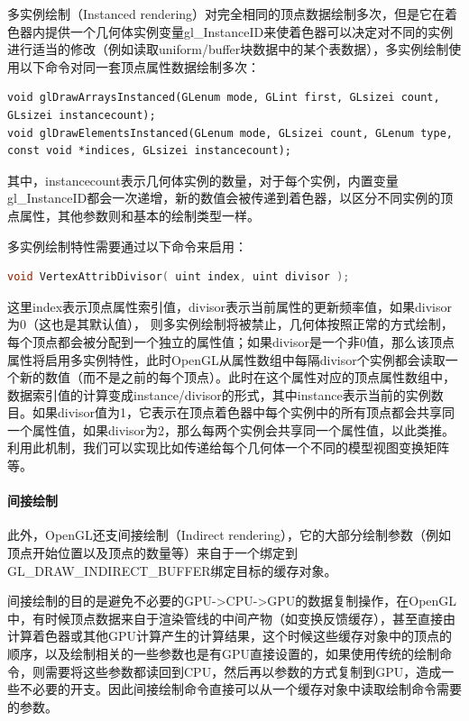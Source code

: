多实例绘制（Instanced rendering）对完全相同的顶点数据绘制多次，但是它在着色器内提供一个几何体实例变量gl\_InstanceID来使着色器可以决定对不同的实例进行适当的修改（例如读取uniform/buffer块数据中的某个表数据），多实例绘制使用以下命令对同一套顶点属性数据绘制多次：

\begin{lstlisting}
void glDrawArraysInstanced​(GLenum mode​, GLint first​, GLsizei count​, GLsizei instancecount​);
void glDrawElementsInstanced​(GLenum mode​, GLsizei count​, GLenum type​, const void *indices​, GLsizei instancecount​);
\end{lstlisting}

其中，instancecount表示几何体实例的数量，对于每个实例，内置变量gl\_InstanceID都会一次递增，新的数值会被传递到着色器，以区分不同实例的顶点属性，其他参数则和基本的绘制类型一样。

多实例绘制特性需要通过以下命令来启用：

\begin{lstlisting}[language=C++]
void VertexAttribDivisor( uint index, uint divisor );
\end{lstlisting}

这里index表示顶点属性索引值，divisor表示当前属性的更新频率值，如果divisor为0（这也是其默认值）， 则多实例绘制将被禁止，几何体按照正常的方式绘制，每个顶点都会被分配到一个独立的属性值；如果divisor是一个非0值，那么该顶点属性将启用多实例特性，此时OpenGL从属性数组中每隔divisor个实例都会读取一个新的数值（而不是之前的每个顶点）。此时在这个属性对应的顶点属性数组中，数据索引值的计算变成instance/divisor的形式，其中instance表示当前的实例数目。如果divisor值为1，它表示在顶点着色器中每个实例中的所有顶点都会共享同一个属性值，如果divisor为2，那么每两个实例会共享同一个属性值，以此类推。利用此机制，我们可以实现比如传递给每个几何体一个不同的模型视图变换矩阵等。





\paragraph{间接绘制}
此外，OpenGL还支间接绘制（Indirect rendering），它的大部分绘制参数（例如顶点开始位置以及顶点的数量等）来自于一个绑定到GL\_DRAW\_INDIRECT\_BUFFER绑定目标的缓存对象。

间接绘制的目的是避免不必要的GPU->CPU->GPU的数据复制操作，在OpenGL中，有时候顶点数据来自于渲染管线的中间产物（如变换反馈缓存），甚至直接由计算着色器或其他GPU计算产生的计算结果，这个时候这些缓存对象中的顶点的顺序，以及绘制相关的一些参数也是有GPU直接设置的，如果使用传统的绘制命令，则需要将这些参数都读回到CPU，然后再以参数的方式复制到GPU，造成一些不必要的开支。因此间接绘制命令直接可以从一个缓存对象中读取绘制命令需要的参数。

